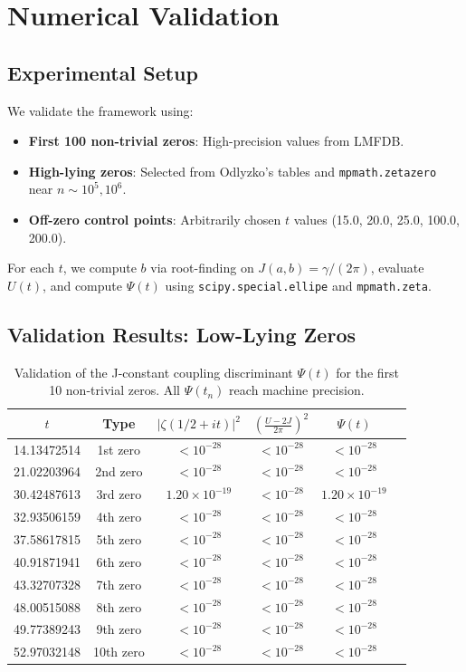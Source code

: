\documentclass[11pt,a4paper]{article}
\theoremstyle{definition}
\begin{document}
\section{Numerical Validation}\label{sec:validation}

\subsection{Experimental Setup}
We validate the framework using:
\begin{itemize}[leftmargin=2em]
    \item \textbf{First 100 non-trivial zeros}: High-precision values from LMFDB.
    \item \textbf{High-lying zeros}: Selected from Odlyzko's tables and \texttt{mpmath.zetazero} near \(n \sim 10^5, 10^6\).
    \item \textbf{Off-zero control points}: Arbitrarily chosen \(t\) values (15.0, 20.0, 25.0, 100.0, 200.0).
\end{itemize}
For each \(t\), we compute \(b\) via root-finding on \(J(a,b) = \gamma/(2\pi)\), evaluate \(U(t)\), and compute \(\Psi(t)\) using \texttt{scipy.special.ellipe} and \texttt{mpmath.zeta}.

\subsection{Validation Results: Low-Lying Zeros}

\begin{table}[h!]
\centering
\caption{Validation of the J-constant coupling discriminant \(\Psi(t)\) for the first 10 non-trivial zeros. All \(\Psi(t_n)\) reach machine precision.}
\label{tab:psi_validation_low}
\begin{tabular}{cccccc}
\toprule
$t$ & Type & $|\zeta(1/2+it)|^2$ & $\left(\frac{U-2J}{2\pi}\right)^2$ & $\Psi(t)$ \\
\midrule
14.13472514 & 1st zero & $<10^{-28}$ & $<10^{-28}$ & $<10^{-28}$ \\
21.02203964 & 2nd zero & $<10^{-28}$ & $<10^{-28}$ & $<10^{-28}$ \\
30.42487613 & 3rd zero & $1.20\times10^{-19}$ & $<10^{-28}$ & $1.20\times10^{-19}$ \\
32.93506159 & 4th zero & $<10^{-28}$ & $<10^{-28}$ & $<10^{-28}$ \\
37.58617815 & 5th zero & $<10^{-28}$ & $<10^{-28}$ & $<10^{-28}$ \\
40.91871941 & 6th zero & $<10^{-28}$ & $<10^{-28}$ & $<10^{-28}$ \\
43.32707328 & 7th zero & $<10^{-28}$ & $<10^{-28}$ & $<10^{-28}$ \\
48.00515088 & 8th zero & $<10^{-28}$ & $<10^{-28}$ & $<10^{-28}$ \\
49.77389243 & 9th zero & $<10^{-28}$ & $<10^{-28}$ & $<10^{-28}$ \\
52.97032148 & 10th zero & $<10^{-28}$ & $<10^{-28}$ & $<10^{-28}$ \\
\bottomrule
\end{tabular}
\end{table}
\end{document}
